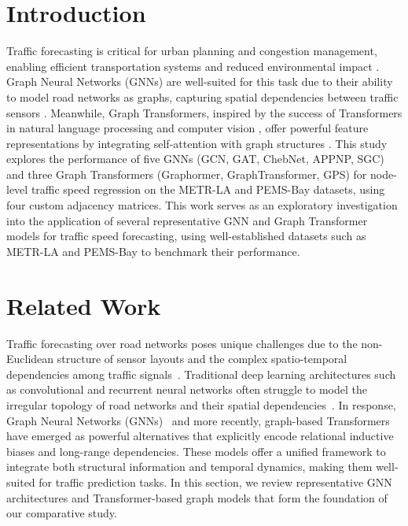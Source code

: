 \documentclass[runningheads]{llncs}
\begin{document}
\section{Introduction}
Traffic forecasting is critical for urban planning and congestion management, enabling efficient transportation systems and reduced environmental impact \cite{li2018dcrnn}. Graph Neural Networks (GNNs) are well-suited for this task due to their ability to model road networks as graphs, capturing spatial dependencies between traffic sensors \cite{wu2020gnn}. Meanwhile, Graph Transformers, inspired by the success of Transformers in natural language processing and computer vision \cite{vaswani2017attention}, offer powerful feature representations by integrating self-attention with graph structures \cite{dwivedi2021generalization}. This study explores the performance of five GNNs (GCN, GAT, ChebNet, APPNP, SGC) and three Graph Transformers (Graphormer, GraphTransformer, GPS) for node-level traffic speed regression on the METR-LA and PEMS-Bay datasets, using four custom adjacency matrices. This work serves as an exploratory investigation into the application of several representative GNN and Graph Transformer models for traffic speed forecasting, using well-established datasets such as METR-LA \cite{li2018dcrnn} and PEMS-Bay \cite{li2018dcrnn} to benchmark their performance.

\section{Related Work}
Traffic forecasting over road networks poses unique challenges due to the non-Euclidean structure of sensor layouts and the complex spatio-temporal dependencies among traffic signals~\cite{li2018dcrnn}. Traditional deep learning architectures such as convolutional and recurrent neural networks often struggle to model the irregular topology of road networks and their spatial dependencies~\cite{zhang2017deep}. In response, Graph Neural Networks (GNNs)~\cite{wu2020comprehensive} and more recently, graph-based Transformers~\cite{ying2021graphormer} have emerged as powerful alternatives that explicitly encode relational inductive biases and long-range dependencies. These models offer a unified framework to integrate both structural information and temporal dynamics, making them well-suited for traffic prediction tasks. In this section, we review representative GNN architectures and Transformer-based graph models that form the foundation of our comparative study.\\
\end{document}
